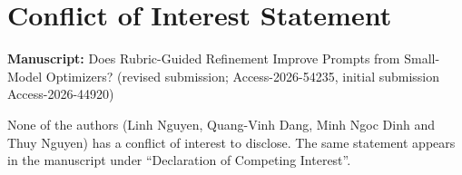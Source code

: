 \documentclass[11pt]{article}
\begin{document}
\section*{Conflict of Interest Statement}
\textbf{Manuscript:} Does Rubric-Guided Refinement Improve Prompts from Small-Model Optimizers? (revised submission; Access-2026-54235, initial submission Access-2026-44920)

None of the authors (Linh Nguyen, Quang-Vinh Dang, Minh Ngoc Dinh and Thuy Nguyen) has a conflict of interest to
disclose. The same statement appears in the manuscript under ``Declaration of Competing Interest''.
\end{document}
